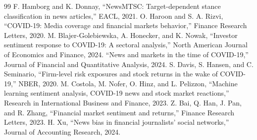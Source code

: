 \documentclass[conference]{IEEEtran}
\begin{document}

\begin{thebibliography}{99}
 F. Hamborg and K. Donnay, ``NewsMTSC: Target-dependent stance classification in news articles,'' EACL, 2021.
 O. Haroon and S. A. Rizvi, ``COVID-19: Media coverage and financial markets behavior,'' Finance Research Letters, 2020.
 M. Blajer-Golebiewska, A. Honecker, and K. Nowak, ``Investor sentiment response to COVID-19: A sectoral analysis,'' North American Journal of Economics and Finance, 2024.
 ``News and markets in the time of COVID-19,'' Journal of Financial and Quantitative Analysis, 2024.
 S. Davis, S. Hansen, and C. Seminario, ``Firm-level risk exposures and stock returns in the wake of COVID-19,'' NBER, 2020.
 M. Costola, M. Nofer, O. Hinz, and L. Pelizzon, ``Machine learning sentiment analysis, COVID-19 news and stock market reactions,'' Research in International Business and Finance, 2023.
 Z. Bai, Q. Han, J. Pan, and R. Zhang, ``Financial market sentiment and returns,'' Finance Research Letters, 2023.
 H. Xu, ``News bias in financial journalists' social networks,'' Journal of Accounting Research, 2024.
\end{thebibliography}
\end{document}
